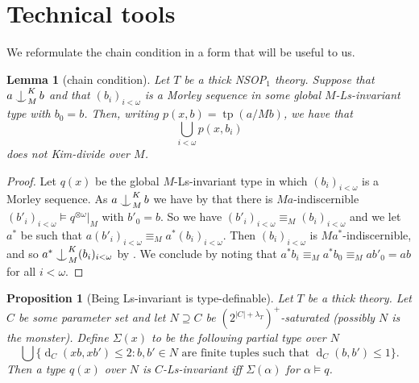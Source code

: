 \documentclass[a4paper, reqno]{amsart}
\newtheorem{proposition}[theorem]{Proposition}
\newtheorem{lemma}[theorem]{Lemma}
\theoremstyle{definition}
\theoremstyle{repeat}
\DeclareMathOperator{\tp}{tp}
\renewcommand{\d}{\operatorname{d}}
\def\Ind#1#2{#1\setbox0=\hbox{$#1x$}\kern\wd0\hbox to 0pt{\hss$#1\mid$\hss}
\lower.9\ht0\hbox to 0pt{\hss$#1\smile$\hss}\kern\wd0}
\def\ind{\mathop{\mathpalette\Ind{}}}
\begin{document}
\section{Technical tools}
\label{sec:technical-tools}
We reformulate the chain condition in a form that will be useful to us.
\begin{lemma}[chain condition]
Let $T$ be a thick NSOP$_1$ theory. Suppose that $a \ind^K_M b$ and that $(b_i)_{i < \omega}$ is a Morley sequence in some global $M$-Ls-invariant type with $b_0 = b$. Then, writing $p(x, b) = \tp(a/Mb)$, we have that
\[
\bigcup_{i < \omega} p(x, b_i)
\]
does not Kim-divide over $M$.
\end{lemma}
\begin{proof}
Let $q(x)$ be the global $M$-Ls-invariant type in which $(b_i)_{i < \omega}$ is a Morley sequence. As $a \ind^K_M b$ we have by \cite[Proposition 4.2]{dobrowolski_kim-independence_2022} that there is $Ma$-indiscernible $(b'_i)_{i < \omega} \models q^{\otimes \omega}|_M$ with $b'_0 = b$. So we have $(b'_i)_{i < \omega} \equiv_M (b_i)_{i < \omega}$ and we let $a^*$ be such that $a (b'_i)_{i < \omega} \equiv_M a^* (b_i)_{i < \omega}$. Then $(b_i)_{i < \omega}$ is $Ma^*$-indiscernible, and so $a^* \ind^K_M (b_i)_{i < \omega}$ by \cite[Lemma 6.1]{dobrowolski_kim-independence_2022}. We conclude by noting that $a^* b_i \equiv_M a^* b_0 \equiv_M a b'_0 = ab$ for all $i < \omega$.
\end{proof}
\begin{proposition}[Being Ls-invariant is type-definable]
Let $T$ be a thick theory. Let $C$ be some parameter set and let $N \supseteq C$ be $(2^{|C|+\lambda_T})^+$-saturated (possibly $N$ is the monster). Define $\Sigma(x)$ to be the following partial type over $N$
\[
\bigcup \{ \d_C(xb, xb') \leq 2 : b, b' \in N \text{ are finite tuples such that } \d_C(b, b') \leq 1 \}.
\]
Then a type $q(x)$ over $N$ is $C$-Ls-invariant iff $\Sigma(\alpha)$ for $\alpha \models q$.
\end{proposition}
\end{document}
